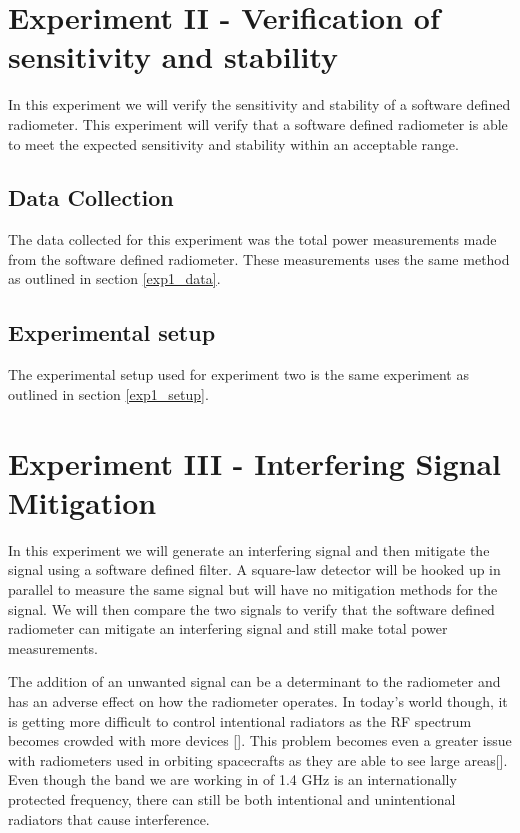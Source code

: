 
\section{Experiment II - Verification of sensitivity and stability}\label{Exp2}

In this experiment we will verify the sensitivity and stability of a software defined radiometer.  This experiment will verify that a software defined radiometer is able to meet the expected sensitivity and stability within an acceptable range.    

\subsection{Data Collection}
The data collected for this experiment was the total power measurements made from the software defined radiometer.  These measurements uses the same method as outlined in section \ref{exp1_data}.

\subsection{Experimental setup} \label{exp2_setup}
The experimental setup used for experiment two is the same experiment as outlined in section \ref{exp1_setup}.  


\section{Experiment III - Interfering Signal Mitigation}\label{Exp3}

In this experiment we will generate an interfering signal and then mitigate the signal using a software defined filter.  A square-law detector will be hooked up in parallel to measure the same signal but will have no mitigation methods for the signal.  We will then compare the two signals to verify that the software defined radiometer can mitigate an interfering signal and still make total power measurements.

The addition of an unwanted signal can be a determinant to the radiometer and has an adverse effect on how the radiometer operates.  In today's world though, it is getting more difficult to control intentional radiators as the RF spectrum becomes crowded with more devices [\cite{Ellingson}].  This problem becomes even a greater issue with radiometers used in orbiting spacecrafts as they are able to see large areas[\cite{DeRooRFI}].  Even though the band we are working in of 1.4 GHz is an internationally protected frequency, there can still be both intentional and unintentional radiators that cause interference.

